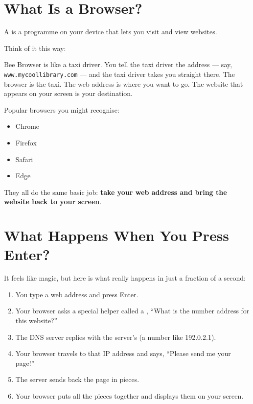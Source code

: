 \sectionrule

\section*{What Is a Browser?}

A  is a programme on your device that lets you visit and view websites.

Think of it this way:

\begin{picturethis}
  Bee Browser is like a taxi driver.
  You tell the taxi driver the address — say, \texttt{www.mycoollibrary.com} —
  and the taxi driver takes you straight there.
  The browser is the taxi.
  The web address is where you want to go.
  The website that appears on your screen is your destination.
\end{picturethis}

Popular browsers you might recognise:
\begin{itemize}
  \item Chrome
  \item Firefox
  \item Safari
  \item Edge
\end{itemize}

They all do the same basic job: \textbf{take your web address and bring the website back to your screen}.

\sectionrule

\section*{What Happens When You Press Enter?}

It feels like magic, but here is what really happens in just a fraction of a second:

\begin{quickmap}
  \begin{enumerate}[label=\textbf{\arabic*.}]
    \item You type a web address and press Enter.
    \item Your browser asks a special helper called a ,
          ``What is the number address for this website?''
    \item The DNS server replies with the server's  (a number like 192.0.2.1).
    \item Your browser travels to that IP address and says, ``Please send me your page!''
    \item The server sends back the page in pieces.
    \item Your browser puts all the pieces together and displays them on your screen.
  \end{enumerate}
\end{quickmap}


